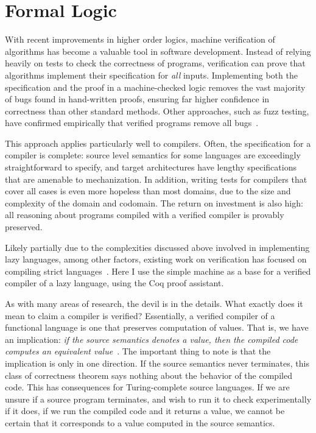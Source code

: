 \section{Formal Logic} \label{sec:background}

With recent improvements in higher order logics, machine verification of
algorithms has become a valuable tool in software development. Instead of
relying heavily on tests to check the correctness of programs, verification can
prove that algorithms implement their specification for \emph{all} inputs.
Implementing both the specification and the proof in a machine-checked logic
removes the vast majority of bugs found in hand-written proofs, ensuring far
higher confidence in correctness than other standard methods. Other approaches,
such as fuzz testing, have confirmed empirically that verified programs remove
all bugs~\cite{yangfuzz}.

This approach applies particularly well to compilers. Often, the specification
for a compiler is complete: source level semantics for some languages are
exceedingly straightforward to specify, and target architectures have lengthy
specifications that are amenable to mechanization. In addition, writing tests
for compilers that cover all cases is even more hopeless than most domains, due
to the size and complexity of the domain and codomain. The return on investment
is also high: all reasoning about programs compiled with a verified compiler is
provably preserved. 

Likely partially due to the complexities discussed above involved in
implementing lazy languages, among other factors, existing work on verification
has focused on compiling strict languages~\cite{chlipala2007certified,
leroy2012compcert, cakeml14}. Here I use the simple \ce machine as a base for a
verified compiler of a lazy language, using the Coq proof assistant. 

As with many areas of research, the devil is in the details. What exactly does
it mean to claim a compiler is verified?  Essentially, a verified compiler of a
functional language is one that preserves computation of values. That is, we
have an implication: \emph{if the source semantics denotes a value, then the
compiled code computes an equivalent value}~\cite{chlipala2007certified}. The
important thing to note is that the implication is only in one direction. If the
source semantics never terminates, this class of correctness theorem says
nothing about the behavior of the compiled code. This has consequences for
Turing-complete source languages. If we are unsure if a source program
terminates, and wish to run it to check experimentally if it does, if we run the
compiled code and it returns a value, we cannot be certain that it corresponds
to a value computed in the source semantics. 

